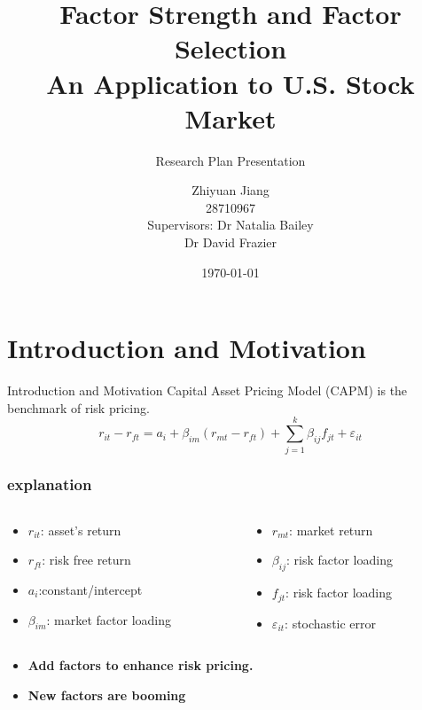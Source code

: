 \documentclass[12pt]{beamer}
\title{Factor Strength and Factor Selection\\
		\large
An Application to U.S. Stock Market }
\subtitle{Research Plan Presentation}
\date{\today}
\author[author]{Zhiyuan Jiang\\
			28710967\\[10mm]{\small Supervisors: Dr Natalia Bailey \\ \hspace{18.5mm} Dr David Frazier}}
\begin{document}
	
\frame[plain]{\titlepage}

\section{Introduction and Motivation}
\begin{frame}{Introduction and Motivation}
Capital Asset Pricing Model (CAPM) is the benchmark of risk pricing.
\[r_{it} - r_{ft} = a_i + \beta_{im}(r_{mt} - r_{ft}) + \sum_{j=1}^{k}\beta_{ij}f_{jt} + \varepsilon_{it} \]

\frametitle{explanation}
\begin{columns}
	\begin{column}{0.5\textwidth}
\begin{itemize}
\item $r_{it}$: asset's return
\item $r_{ft}$: risk free return
\item $a_i$:constant/intercept
\item $\beta_{im}$: market factor loading
\end{itemize}
	\end{column}
	\begin{column}{0.5\textwidth}  %
		\begin{center}
\begin{itemize}
\item $r_{mt}$: market return 
\item$\beta_{ij}$: risk factor loading
\item $f_{jt}$: risk factor loading
\item $\varepsilon_{it}$: stochastic error
\end{itemize}
		\end{center}
	\end{column}
\end{columns}
\begin{itemize}
\item{\bf Add factors to enhance risk pricing.}
\item{\bf  New factors are booming }
\end{itemize}

\end{frame}
\end{document}
